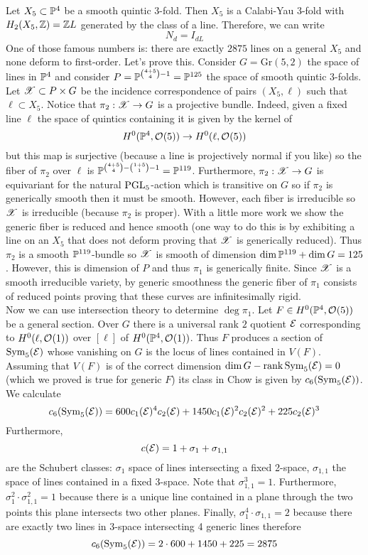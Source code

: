 \documentclass[12pt]{article}
\begin{document}
\begin{example}
Let $X_5 \subset \P^4$ be a smooth quintic 3-fold. Then $X_5$ is a Calabi-Yau 3-fold with $H_2(X_5, \Z) = \Z L$ generated by the class of a line. Therefore, we can write
\[ N_d = I_{d L} \]
One of those famous numbers is: there are exactly $2875$ lines on a general $X_5$ and none deform to first-order. Let's prove this. Consider $G = \mathrm{Gr}(5, 2)$ the space of lines in $\P^4$ and consider $P = \P^{{4 + 5 \choose 4} - 1} = \P^{125}$ the space of smooth quintic 3-folds. Let $\X \subset P \times G$ be the incidence correspondence of pairs $(X_5, \ell)$ such that $\ell \subset X_5$. Notice that $\pi_2 : \X \to G$ is a projective bundle. Indeed, given a fixed line $\ell$ the space of quintics containing it is given by the kernel of
\[ H^0(\P^4, \struct{}(5)) \to H^0(\ell, \struct{}(5)) \]
but this map is surjective (because a line is projectively normal if you like) so the fiber of $\pi_2$ over $\ell$ is $\P^{{4 + 5 \choose 4} - {1 + 5 \choose 1} - 1} = \P^{119}$. Furthermore, $\pi_2 : \X \to G$ is equivariant for the natural $\PGL_5$-action which is transitive on $G$ so if $\pi_2$ is generically smooth then it must be smooth. However, each fiber is irreducible so $\X$ is irreducible (because $\pi_2$ is proper). With a little more work we show the generic fiber is reduced and hence smooth (one way to do this is by exhibiting a line on an $X_5$ that does not deform proving that $\X$ is generically reduced). Thus $\pi_2$ is a smooth $\P^{119}$-bundle so $\X$ is smooth of dimension $\dim{\P^{119}} + \dim{G} = 125$. However, this is dimension of $P$ and thus $\pi_1$ is generically finite. Since $\X$ is a smooth irreducible variety, by generic smoothness the generic fiber of $\pi_1$ consists of reduced points proving that these curves are infinitesimally rigid. 
\bigskip\\
Now we can use intersection theory to determine $\deg{\pi_1}$. Let $F \in H^0(\P^4, \struct{}(5))$ be a general section. Over $G$ there is a universal rank $2$ quotient $\E$ corresponding to $H^0(\ell, \struct{}(1))$ over $[\ell]$ of $H^0(\P^4, \struct{}(1))$. Thus $F$ produces a section of $\Sym{5}{\E}$ whose vanishing on $G$ is the locus of lines contained in $V(F)$. Assuming that $V(F)$ is of the correct dimension $\dim{G} - \rank{\Sym{5}{\E}} = 0$ (which we proved is true for generic $F$) its class in Chow is given by $c_6(\Sym{5}{\E})$. We calculate
\[ c_6(\Sym{5}{\E}) = 600 c_1(\E)^4 c_2(\E) + 1450 c_1(\E)^2 c_2(\E)^2 + 225 c_2(\E)^3 \]
Furthermore, 
\[ c(\E) = 1 + \sigma_1 + \sigma_{1,1} \]
are the Schubert classes: $\sigma_1$ space of lines intersecting a fixed 2-space, $\sigma_{1,1}$ the space of lines contained in a fixed 3-space. Note that $\sigma_{1,1}^3 = 1$. Furthermore, $\sigma_{1}^2 \cdot \sigma_{1,1}^2 = 1$ because there is a unique line contained in a plane through the two points this plane intersects two other planes. Finally, $\sigma_1^4 \cdot \sigma_{1,1} = 2$ because there are exactly two lines in 3-space intersecting 4 generic lines  therefore
\[ c_6(\Sym{5}{\E}) = 2 \cdot 600 + 1450 + 225 = 2875 \]
\end{example}
\end{document}
